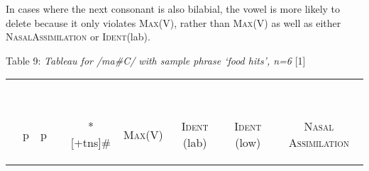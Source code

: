 \documentclass[output=paper,
modfonts
]{langscibook}
\begin{document}
In cases where the next consonant is also bilabial, the vowel is more likely to delete because it only violates \textsc{Max}(V), rather than \textsc{Max}(V) as well as either \textsc{NasalAssimilation} or \textsc{Ident}(lab). 

\begin{center}Table 9: \textit{Tableau for /ma\#C/ with sample phrase ‘food hits’, n=6}
\renewcommand*\arraystretch{1.2}
\vspace{1.0cm} \scalebox{1}[1]{}{\begin{tabular}[t]{|l||c|c|c|c|c|c|c|c|} 
\hline
& & & & & & & & \\
 & & & & & & & & \\
  & & & & & & & &\\
 & & & & & & & &  \\
  & & & & & & & &\\
 & & & & & & & &  \\
{\textipa{}} & \hspace*{0.1cm} p  \hspace*{0.2cm} & \hspace*{0.1cm} p  \hspace*{0.2cm} & \hspace*{0.1cm} \begin{rotate}{45} \end{rotate} \hspace*{0.2cm} & \hspace*{0.1cm} \begin{rotate}{90} *[+tns]\# \end{rotate} \hspace*{0.2cm} & \hspace*{0.1cm} \begin{rotate}{90} \textsc{Max}(V) \end{rotate} \hspace*{0.2cm} & \hspace*{0.1cm} \begin{rotate}{90} \textsc{Ident} (lab) \end{rotate} \hspace*{0.2cm} & \hspace*{0.1cm} \begin{rotate}{90} \textsc{Ident} (low) \end{rotate} \hspace{0.2cm} & \hspace*{0.1cm} \begin{rotate}{90} \textsc{Nasal Assimilation} \end{rotate} \hspace*{0.2cm}\\[.5ex]


\end{tabular}}
\end{center}
\end{document}
